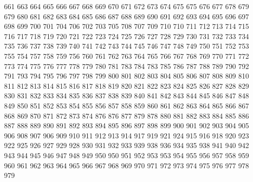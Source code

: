 661
663
664
665
666
667
668
669
670
671
672
673
674
675
675
676
677
678
679
679
680
681
682
683
684
685
686
687
688
689
690
691
692
693
694
695
696
697
698
699
700
701
704
706
702
703
705
708
707
709
710
710
711
712
713
714
715
716
717
718
719
720
721
722
723
724
725
726
727
728
729
730
731
732
733
734
735
736
737
738
739
740
741
742
743
744
745
746
747
748
749
750
751
752
753
755
754
757
758
759
756
760
761
762
763
764
765
766
767
768
769
770
771
772
773
774
775
776
777
778
779
780
781
783
784
783
785
786
787
788
789
790
792
791
793
794
795
796
797
798
799
800
801
802
803
804
805
806
807
808
809
810
811
812
813
814
815
816
817
818
819
820
821
822
823
824
825
826
827
828
829
830
831
832
833
834
835
836
837
838
839
840
841
842
843
844
845
846
847
848
849
850
851
852
853
854
855
856
857
858
859
860
861
862
863
864
865
866
867
868
869
870
871
872
873
874
876
876
877
879
878
880
881
882
883
884
885
886
887
888
889
890
891
892
893
894
895
896
897
898
899
900
901
902
903
904
905
906
908
907
906
909
910
911
912
913
914
917
919
921
924
915
916
918
920
923
922
925
926
927
929
928
930
931
932
933
939
938
936
934
935
938
941
940
942
943
944
945
946
947
948
949
950
950
951
952
953
953
954
955
956
957
958
959
960
961
962
963
964
965
966
967
968
969
970
971
972
973
974
975
976
977
978
979
